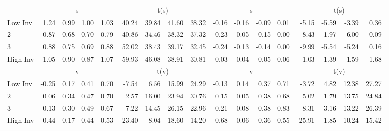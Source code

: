 \begin{table}[!ht]
\begin{tabular}{lrrrrrrrrrrrrrrrr}
  
    
      & \multicolumn{4}{c}{s} & \multicolumn{4}{c}{t(s)}
    
      & \multicolumn{4}{c}{s} & \multicolumn{4}{c}{t(s)}
    
    \\
      \cmidrule(r){2-5} \cmidrule(r){6-9} \cmidrule(r){10-13} \cmidrule(r){14-17}

    Low Inv   & 1.24  & 0.99  & 1.00  & 1.03  & 40.24  & 39.84  & 41.60  & 38.32  & -0.16  & -0.16  & -0.09  & 0.01  & -5.15  & -5.59  & -3.39  & 0.36  \\
           2  & 0.87  & 0.68  & 0.70  & 0.79  & 40.86  & 34.46  & 38.32  & 37.32  & -0.23  & -0.05  & -0.15  & 0.00  & -8.43  & -1.97  & -6.00  & 0.09  \\
           3  & 0.88  & 0.75  & 0.69  & 0.88  & 52.02  & 38.43  & 39.17  & 32.45  & -0.24  & -0.13  & -0.14  & 0.00  & -9.99  & -5.54  & -5.24  & 0.16  \\
    High Inv  & 1.05  & 0.90  & 0.87  & 1.07  & 59.93  & 46.08  & 38.91  & 30.81  & -0.03  & -0.04  & -0.05  & 0.06  & -1.03  & -1.39  & -1.59  & 1.68  \\

  
    
      & \multicolumn{4}{c}{v} & \multicolumn{4}{c}{t(v)}
    
      & \multicolumn{4}{c}{v} & \multicolumn{4}{c}{t(v)}
    
    \\
      \cmidrule(r){2-5} \cmidrule(r){6-9} \cmidrule(r){10-13} \cmidrule(r){14-17}

    Low Inv   & -0.25  & 0.17  & 0.41  & 0.70  & -7.54  & 6.56  & 15.99  & 24.29  & -0.13  & 0.14  & 0.37  & 0.71  & -3.72  & 4.82  & 12.38  & 27.27  \\
           2  & -0.06  & 0.34  & 0.47  & 0.70  & -2.57  & 16.00  & 23.94  & 30.76  & -0.15  & 0.05  & 0.38  & 0.68  & -5.02  & 1.79  & 13.75  & 24.84  \\
           3  & -0.13  & 0.30  & 0.49  & 0.67  & -7.22  & 14.45  & 26.15  & 22.96  & -0.21  & 0.08  & 0.38  & 0.83  & -8.31  & 3.16  & 13.22  & 26.39  \\
    High Inv  & -0.44  & 0.17  & 0.44  & 0.53  & -23.40  & 8.04  & 18.60  & 14.20  & -0.68  & 0.06  & 0.36  & 0.55  & -25.91  & 1.85  & 10.24  & 15.42  \\

  

  \bottomrule
\end{tabular}
\label{tbl:32_Size_BM_Inv_F93}
\end{table}